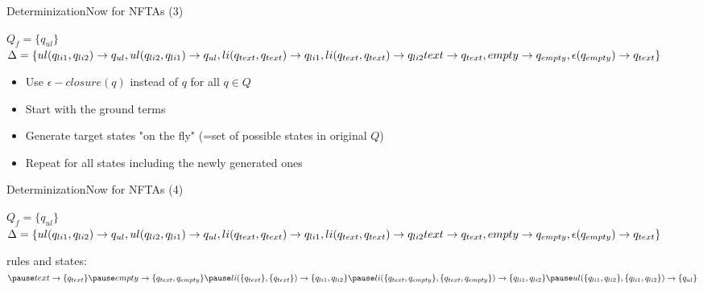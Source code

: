 \documentclass{beamer}
\begin{document}
\begin{frame}{Determinization}{Now for NFTAs (3)}
	\begin{example}
		\(Q_f = \{q_{ul }\}\)
		\newline
		\(\Delta = \{
					ul(q_{li1},q_{li2}) \rightarrow q_{ul}, ul(q_{li2},q_{li1}) \rightarrow q_{ul}, \newline
					li(q_{text},q_{text}) \rightarrow q_{li1}, li(q_{text}, q_{text}) \rightarrow q_{li2}\newline
					text \rightarrow q_{text}, empty \rightarrow q_{empty}, \newline
					\epsilon(q_{empty}) \rightarrow q_{text}
		\}\)
	\end{example}
	\begin{block}{}
		\begin{itemize}
			\item {
				Use \(\epsilon-closure(q)\) instead of \(q\) for all \(q \in Q\)
			}
			\item {
				Start with the ground terms
			}
			\item {
				Generate target states "on the fly" (=set of possible states in original \(Q\))
			}
			\item {
				Repeat for all states including the newly generated ones
			}
		\end{itemize}
	\end{block}
\end{frame}


\begin{frame}{Determinization}{Now for NFTAs (4)}
	\begin{example}
		\(Q_f = \{q_{ul }\}\)
		\newline
		\(\Delta = \{
					ul(q_{li1},q_{li2}) \rightarrow q_{ul}, ul(q_{li2},q_{li1}) \rightarrow q_{ul}, \newline
					li(q_{text},q_{text}) \rightarrow q_{li1}, li(q_{text}, q_{text}) \rightarrow q_{li2}\newline
					text \rightarrow q_{text}, empty \rightarrow q_{empty}, \newline
					\epsilon(q_{empty}) \rightarrow q_{text}
		\}\)
	\end{example}
	\begin{block}{}
		rules and states:
		\(
			\newline \pause
			text \rightarrow \{q_{text}\} 
			\newline \pause
			empty \rightarrow \{q_{text}, q_{empty}\}
			\newline \pause
			li(\{q_{text}\}, \{q_{text}\}) \rightarrow \{q_{li1}, q_{li2}\}
			\newline \pause
			li(\{q_{text}, q_{empty}\}, \{q_{text}, q_{empty}\}) \rightarrow \{q_{li1}, q_{li2}\}
			\newline \pause
			ul(\{q_{li1}, q_{li2}\}, \{q_{li1}, q_{li2}\}) \rightarrow \{q_{ul}\}
		\)	
	\end{block}
\end{frame}
\end{document}
